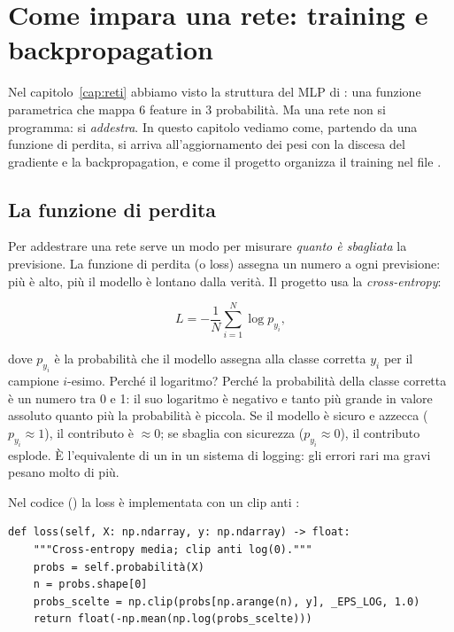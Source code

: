 
\chapter{Come impara una rete: training e backpropagation}\label{cap:training}

Nel capitolo~\ref{cap:reti} abbiamo visto la struttura del MLP di
\progetto{}: una funzione parametrica che mappa 6 feature in 3 probabilità.
Ma una rete non si programma: si \emph{addestra}. In questo capitolo vediamo
come, partendo da una funzione di perdita, si arriva all'aggiornamento dei
pesi con la discesa del gradiente e la backpropagation, e come il progetto
\progetto{} organizza il training nel file
.

\section{La funzione di perdita}\label{sec:funzione-perdita}

Per addestrare una rete serve un modo per misurare \emph{quanto è sbagliata}
la previsione. La funzione di perdita (o loss) assegna un numero a ogni
previsione: più è alto, più il modello è lontano dalla verità. Il progetto
usa la \emph{cross-entropy}:

\begin{equation}
L = -\frac{1}{N} \sum_{i=1}^{N} \log p_{y_i},
\end{equation}

dove $p_{y_i}$ è la probabilità che il modello assegna alla classe corretta
$y_i$ per il campione $i$-esimo. Perché il logaritmo? Perché la probabilità
della classe corretta è un numero tra 0 e 1: il suo logaritmo è negativo e
tanto più grande in valore assoluto quanto più la probabilità è piccola.
Se il modello è sicuro e azzecca ($p_{y_i} \approx 1$), il contributo è
$\approx 0$; se sbaglia con sicurezza ($p_{y_i} \approx 0$), il contributo
esplode. È l'equivalente di un  in un sistema di logging: gli
errori rari ma gravi pesano molto di più.

Nel codice () la loss è
implementata con un clip anti :

\begin{lstlisting}[caption={Cross-entropy media in \file{mlp.py} (metodo \codice{loss}).}]
def loss(self, X: np.ndarray, y: np.ndarray) -> float:
    """Cross-entropy media; clip anti log(0)."""
    probs = self.probabilità(X)
    n = probs.shape[0]
    probs_scelte = np.clip(probs[np.arange(n), y], _EPS_LOG, 1.0)
    return float(-np.mean(np.log(probs_scelte)))
\end{lstlisting}


